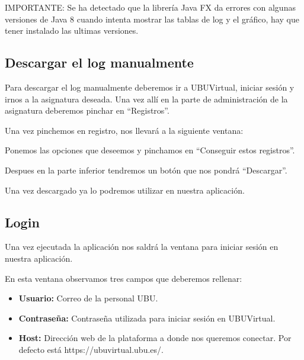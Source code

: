
IMPORTANTE: Se ha detectado que la librería Java FX da errores con algunas versiones de Java 8 cuando intenta mostrar las tablas de log y el gráfico, hay que tener instalado las ultimas versiones.

\subsection{Descargar el log manualmente}

Para descargar el log manualmente deberemos ir a UBUVirtual, iniciar sesión y irnos a la asignatura deseada. Una vez allí en la parte de administración de la asignatura deberemos pinchar en ``Registros''.


\newpage Una vez pinchemos en registro, nos llevará a la siguiente ventana:


Ponemos las opciones que deseemos y pinchamos en ``Conseguir estos registros''.


Despues en la parte inferior tendremos un botón que nos pondrá ``Descargar''.


Una vez descargado ya lo podremos utilizar en nuestra aplicación.


\subsection{Login}


Una vez ejecutada la aplicación nos saldrá la ventana para iniciar sesión en nuestra aplicación.


En esta ventana observamos tres campos que deberemos rellenar:

\begin{itemize}
	\tightlist
	\item
	\textbf{Usuario:} Correo de la personal UBU.
	\item
	\textbf{Contraseña:} Contraseña utilizada para iniciar sesión en UBUVirtual.
	\item
	\textbf{Host:} Dirección web de la plataforma a donde nos queremos conectar. Por defecto está https://ubuvirtual.ubu.es/.
\end{itemize}

